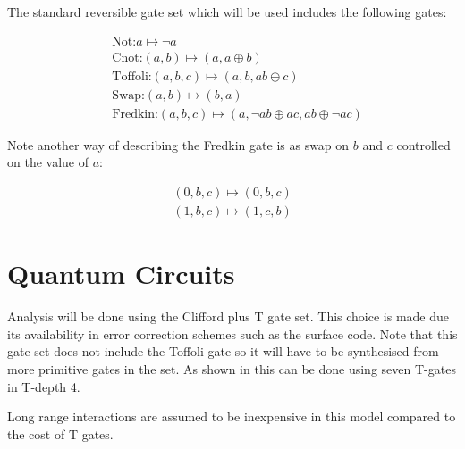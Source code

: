 The standard reversible gate set which will be used includes the following gates:

\begin{align*}
	&\text{Not:} a \mapsto \neg a \\
	&\text{Cnot:} (a,b) \mapsto (a,a\oplus b) \\
        &\text{Toffoli:} (a,b,c) \mapsto (a,b,ab\oplus c) \\
	&\text{Swap:} (a,b) \mapsto (b,a) \\
	&\text{Fredkin:} (a,b,c) \mapsto (a,\neg a b \oplus ac, ab\oplus \neg a c)
\end{align*}

Note another way of describing the Fredkin gate is as swap on $b$ and $c$
controlled on the value of $a$:

\begin{align*}
    (0,b,c) \mapsto (0,b,c)\\
    (1,b,c) \mapsto (1,c,b)
\end{align*}


\section{Quantum Circuits}

Analysis will be done using the Clifford plus T gate set.  This choice is made
due its availability in error correction schemes such as the surface
code\cite{fowler2012}.  Note that this gate set does not include the Toffoli
gate so it will have to be synthesised from more primitive gates in the set.
As shown in \cite{amy2013} this can be done using seven T-gates in T-depth 4.

Long range interactions are assumed to be inexpensive in this model compared to
the cost of T gates.

